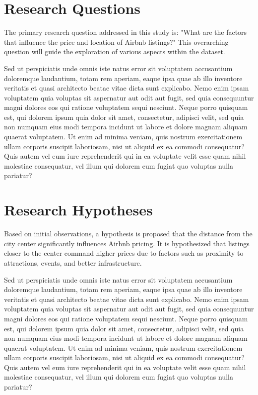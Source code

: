 \documentclass[10pt, conference, compsocconf]{IEEEtran}
\begin{document}
\section{Research Questions}
The primary research question addressed in this study is: "What are the factors that influence the price and location of Airbnb listings?" 
This overarching question will guide the exploration of various aspects within the dataset.

Sed ut perspiciatis unde omnis iste natus error sit voluptatem accusantium doloremque laudantium, totam rem aperiam, eaque ipsa quae ab illo inventore veritatis et quasi architecto beatae vitae dicta sunt explicabo. 
Nemo enim ipsam voluptatem quia voluptas sit aspernatur aut odit aut fugit, sed quia consequuntur magni dolores eos qui ratione voluptatem sequi nesciunt. Neque porro quisquam est, qui dolorem ipsum quia dolor sit amet, consectetur, adipisci velit, sed quia non numquam eius modi tempora incidunt ut labore et dolore magnam aliquam quaerat voluptatem. 
Ut enim ad minima veniam, quis nostrum exercitationem ullam corporis suscipit laboriosam, nisi ut aliquid ex ea commodi consequatur? Quis autem vel eum iure reprehenderit qui in ea voluptate velit esse quam nihil molestiae consequatur, vel illum qui dolorem eum fugiat quo voluptas nulla pariatur?

\section{Research Hypotheses}
Based on initial observations, a hypothesis is proposed that the distance from the city center significantly influences Airbnb pricing. 
It is hypothesized that listings closer to the center command higher prices due to factors such as proximity to attractions, events, and better infrastructure.

Sed ut perspiciatis unde omnis iste natus error sit voluptatem accusantium doloremque laudantium, totam rem aperiam, eaque ipsa quae ab illo inventore veritatis et quasi architecto beatae vitae dicta sunt explicabo. 
Nemo enim ipsam voluptatem quia voluptas sit aspernatur aut odit aut fugit, sed quia consequuntur magni dolores eos qui ratione voluptatem sequi nesciunt. Neque porro quisquam est, qui dolorem ipsum quia dolor sit amet, consectetur, adipisci velit, sed quia non numquam eius modi tempora incidunt ut labore et dolore magnam aliquam quaerat voluptatem. 
Ut enim ad minima veniam, quis nostrum exercitationem ullam corporis suscipit laboriosam, nisi ut aliquid ex ea commodi consequatur? Quis autem vel eum iure reprehenderit qui in ea voluptate velit esse quam nihil molestiae consequatur, vel illum qui dolorem eum fugiat quo voluptas nulla pariatur?
\end{document}

